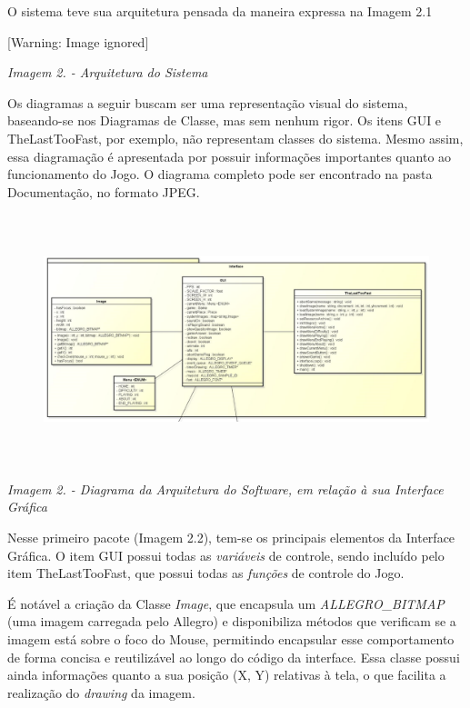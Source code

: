 \documentclass[a4paper]{article}
\newcounter{Imagem2}
\renewcommand\theImagem2{\arabic{Imagem2}}
\newcounter{Imagem1}
\renewcommand\theImagem1{\arabic{Imagem1}}
\begin{document}
O sistema teve sua arquitetura pensada da maneira expressa na Imagem 2.1


  [Warning: Image ignored] %
 

{\centering\itshape\color[rgb]{0.26666668,0.32941177,0.41568628}
Imagem 2. \stepcounter{Imagem2}{\theImagem2} - Arquitetura do Sistema
\par}


\bigskip

Os diagramas a seguir buscam ser uma representação visual do sistema,
baseando-se nos Diagramas de Classe, mas sem nenhum rigor. Os itens GUI
e TheLastTooFast, por exemplo, não representam classes do sistema.
Mesmo assim, essa diagramação é apresentada por possuir informações
importantes quanto ao funcionamento do Jogo. O diagrama completo pode
ser encontrado na pasta Documentação, no formato JPEG.

\begin{figure}
\centering
\includegraphics[width=6.6528in,height=2.8634in]{T1-img8.png}
\end{figure}
{\centering\itshape\color[rgb]{0.26666668,0.32941177,0.41568628}
Imagem 2. \stepcounter{Imagem2}{\theImagem2} - Diagrama da Arquitetura
do Software, em relação à sua Interface Gráfica
\par}


\bigskip

Nesse primeiro pacote (Imagem 2.2), tem-se os principais elementos da
Interface Gráfica. O item GUI possui todas as \textit{variáveis} de
controle, sendo incluído pelo item TheLastTooFast, que possui todas as
\textit{funções} de controle do Jogo.

É notável a criação da Classe \textit{Image}, que encapsula um
\textit{ALLEGRO\_BITMAP} (uma imagem carregada pelo Allegro) e
disponibiliza métodos que verificam se a imagem está sobre o foco do
Mouse, permitindo encapsular esse comportamento de forma concisa e
reutilizável ao longo do código da interface. Essa classe possui ainda
informações quanto a sua posição (X, Y) relativas à tela, o que
facilita a realização do \textit{drawing} da imagem.
\end{document}
